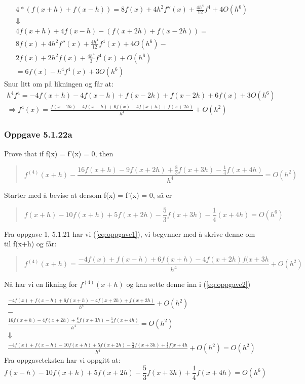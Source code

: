\begin{multline*}
4 * (f(x+h) + f(x-h)) = 8f(x) + 4h^2 f''(x) + \frac{4h^4}{12} f^4 + 4O(h^6) \\
\Downarrow
\\
4f(x+h) + 4f(x-h) - (f(x+2h) + f(x-2h)) = \\ 
8f(x) + 4h^2 f''(x) + \frac{4h^4}{12} f^4 (x) + 4O(h^6) - \\
2f(x) + 2h^2 f(x) + \frac{4h^4}{3} f^4 (x) + O (h^6) \\
= 6f(x) - h^4 f^4 (x) + 3O (h^6)
\end{multline*}
Snur litt om på likningen og får at:
\begin{multline}
h^4 f^4 = -4f(x+h) - 4f(x-h) + f(x-2h) + f(x-2h) + 6f(x) + 3O(h^6)\\
\Rightarrow f^4 (x) = \frac{f(x-2h) - 4f(x-h) + 6f(x) - 4f(x+h) + f(x+2h)}{h^4} + O(h^2)
\end{multline}


\subsubsection{Oppgave 5.1.22a}
Prove that if f(x) = f'(x) = 0, then
\begin{quote}
\begin{equation}\label{eq:oppgave2}
f^{(4)} (x + h) - \frac{16f(x + h) - 9f(x + 2h) + \frac{8}{3}f(x + 3h) - \frac{1}{4}f(x + 4h)}{h^4} = O(h^2)
\end{equation}
\end{quote}
Starter med å bevise at dersom f(x) = f'(x) = 0, så er
\begin{quote}
\begin{equation}
f(x + h) - 10f(x+h) + 5f(x + 2h) - \frac{5}{3}f(x + 3h) - \frac{1}{4}(x+4h) = O(h^6)
\end{equation}
\end{quote}
Fra oppgave 1, 5.1.21 har vi (\ref{eq:oppgave1}), vi begynner med å skrive denne om til f(x+h) og får:
\begin{quote}
\begin{equation}\label{eq:f^4(x+h)}
f^{(4)}(x+h) = \frac{-4f(x) + f(x-h) + 6f(x+h) - 4f(x+2h) f(x+3h}{h^4} + O(h^2)
\end{equation}
\end{quote}

Nå har vi en likning for $ f^{(4)} (x+h)$ og kan sette denne inn i (\ref{eq:oppgave2})


\begin{multline*}
\frac{-4f(x) + f(x-h) + 6f(x+h) - 4f(x+2h) + f(x+3h)}{h^4} + O(h^2)\\
-
\\
\frac{16f(x+h) - 4f(x+2h) + \frac{8}{3}f(x+3h) - \frac{1}{4}f(x+4h)}{h^4}  = O(h^2)
\\
\Downarrow
\\
\frac{-4f(x)+f(x-h)-10f(x+h)+5f(x+2h)-\frac{5}{3}f(x+3h)+\frac{1}{4}f(x+4h}{h^4} + O(h^2) = O(h^2)
\end{multline*}
Fra oppgaveteksten har vi oppgitt at:
\begin{equation*}
f(x-h)-10f(x+h)+5f(x+2h)-\frac{5}{3}f(x+3h)+\frac{1}{4}f(x+4h) = O(h^6)
\end{equation*}

